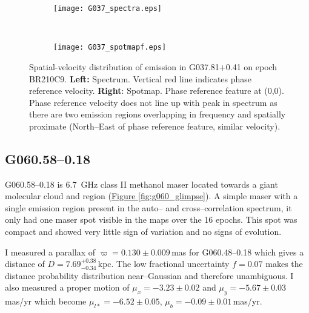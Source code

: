	       	\begin{figure}[h]
	       		\centering
	       		\begin{subfigure}[t]{0.475\textwidth}
	       			\centering
	       			\texttt{[image: G037\_spectra.eps]}
	       		\end{subfigure}
	       		~
	       		\begin{subfigure}[t]{0.475\textwidth}
	       			\centering
	       			\texttt{[image: G037\_spotmapf.eps]}
	       		\end{subfigure}              
	       		\caption[G037.81$+$0.41 Spectrum and Spotmap]{Spatial-velocity distribution of emission in G037.81$+$0.41 on epoch BR210C9. \textbf{Left:} Spectrum. Vertical red line indicates phase reference velocity. \textbf{Right}: Spotmap. Phase reference feature at (0,0). Phase reference velocity does not line up with peak in spectrum as there are two emission regions overlapping in frequency and spatially proximate (North--East of phase reference feature, similar velocity). } \label{fig:g037_spotmap}
	       	\end{figure}

	
		
		\clearpage
        \subsection{G060.58--0.18}            
            G060.58--0.18 is 6.7~GHz class II methanol maser located towards a giant molecular cloud and \hii\space region (\hyperref[fig:g060_glimpse]{Figure \ref*{fig:g060_glimpse}}). A simple maser with a single emission region present in the auto-- and cross--correlation spectrum, it only had one maser spot visible in the maps over the 16 epochs. This spot was compact and showed very little sign of variation and no signs of evolution.
            
            I measured a parallax of $\varpi=0.130\pm0.009$\,mas for G060.48--0.18 which gives a distance of $D=7.69^{+0.38}_{-0.34}$\,kpc. The low fractional uncertainty $f=0.07$ makes the distance probability distribution near--Gaussian and therefore unambiguous. I also measured a proper motion of $\mu_x=-3.23\pm0.02$ and $\mu_y=-5.67\pm0.03$\,mas/yr which become $\mu_{l*}=-6.52\pm0.05$, $\mu_b=-0.09\pm0.01$\,mas/yr.
           
